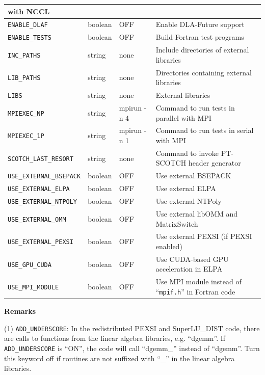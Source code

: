\documentclass{report}
\begin{document}
\begin{longtable}[]{|p{40mm}|p{15mm}|p{20mm}|p{87mm}|}
with NCCL\\
\hline \texttt{ENABLE\_DLAF} & boolean & OFF & Enable DLA-Future support\\
\hline \texttt{ENABLE\_TESTS} & boolean & OFF & Build Fortran test
programs\\
\hline \texttt{INC\_PATHS} & string & none & Include directories of
external libraries\\
\hline \texttt{LIB\_PATHS} & string & none & Directories containing
external libraries\\
\hline \texttt{LIBS} & string & none & External libraries\\
\hline \texttt{MPIEXEC\_NP} & string & mpirun -n 4 & Command to run tests
in parallel with MPI\\
\hline \texttt{MPIEXEC\_1P} & string & mpirun -n 1 & Command to run tests
in serial with MPI\\
\hline

\texttt{SCOTCH\_LAST\_RESORT}     & string  & none        & Command to invoke PT-SCOTCH header generator\\
\hline
\texttt{USE\_EXTERNAL\_BSEPACK}   & boolean & OFF         & Use external BSEPACK\\
\hline
\texttt{USE\_EXTERNAL\_ELPA}      & boolean & OFF         & Use external ELPA\\
\hline
\texttt{USE\_EXTERNAL\_NTPOLY}    & boolean & OFF         & Use external NTPoly\\
\hline
\texttt{USE\_EXTERNAL\_OMM}       & boolean & OFF         & Use external libOMM and MatrixSwitch\\
\hline
\texttt{USE\_EXTERNAL\_PEXSI}     & boolean & OFF         & Use external PEXSI (if PEXSI enabled)\\
\hline
\texttt{USE\_GPU\_CUDA}           & boolean & OFF         & Use CUDA-based GPU acceleration in ELPA\\
\hline
\texttt{USE\_MPI\_MODULE}         & boolean & OFF         & Use MPI module instead of ``\texttt{mpif.h}'' in Fortran code\\
\hline
\end{longtable}

\textbf{Remarks}

(1) \texttt{ADD\_UNDERSCORE}: In the redistributed PEXSI and SuperLU\_DIST code, there are calls to functions from the linear algebra libraries, e.g. ``dgemm''. If \texttt{ADD\_UNDERSCORE} is ``ON'', the code will call ``dgemm\_'' instead of ``dgemm''. Turn this keyword off if routines are not suffixed with ``\_'' in the linear algebra libraries.
\end{document}
